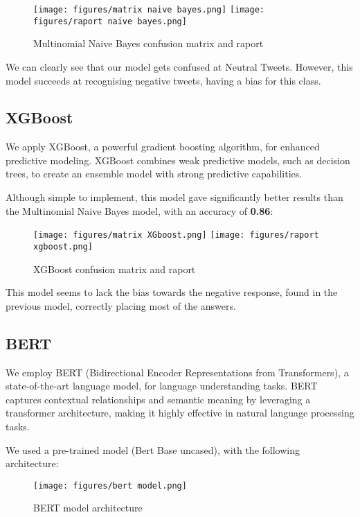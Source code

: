 \documentclass[11pt, a4paper]{article}
\begin{document}
\begin{large}
\begin{figure}[H]
    \centering
    \texttt{[image: figures/matrix naive bayes.png]}
    \texttt{[image: figures/raport naive bayes.png]}
    \caption{Multinomial Naive Bayes confusion matrix and raport}
    \label{fig:enter-label}
\end{figure}

We can clearly see that our model gets confused at Neutral Tweets. However, this model succeeds at recognising negative tweets, having a bias for this class. 

\subsection{XGBoost}

We apply XGBoost, a powerful gradient boosting algorithm, for enhanced predictive modeling. XGBoost combines weak predictive models, such as decision trees, to create an ensemble model with strong predictive capabilities.

Although simple to implement, this model gave significantly better results than the Multinomial Naive Bayes model, with an accuracy of \textbf{0.86}:

\begin{figure}[H]
    \centering
    \texttt{[image: figures/matrix XGboost.png]}
    \texttt{[image: figures/raport xgboost.png]}
    \caption{XGBoost confusion matrix and raport}
    \label{fig:enter-label}
\end{figure}

This model seems to lack the bias towards the negative response, found in the previous model, correctly placing most of the answers.


\subsection{BERT}
We employ BERT (Bidirectional Encoder Representations from Transformers), a state-of-the-art language model, for language understanding tasks. BERT captures contextual relationships and semantic meaning by leveraging a transformer architecture, making it highly effective in natural language processing tasks.

We used a pre-trained model (Bert Base uncased), with the following architecture: 
\begin{figure}[H]
    \centering
    \texttt{[image: figures/bert model.png]}

    \caption{BERT model architecture}
    \label{fig:enter-label}
\end{figure}




\end{large}
\end{document}
